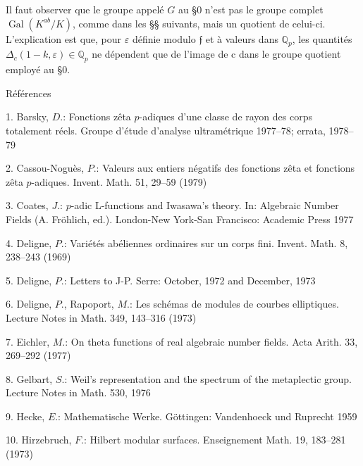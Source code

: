 \documentclass[11pt]{article}
\begin{document}
Il faut observer que le groupe appelé \(G\) au §0 n’est pas le groupe complet \(\operatorname{Gal}(K^{ab}/K)\), comme dans les §§ suivants, mais un quotient de celui-ci. L’explication est que, pour \(\varepsilon \) définie modulo \(𝔣\) et à valeurs dans \(\mathbb{Q}_{p}\), les quantités \(\Delta _{c}(1-k,\varepsilon )\in \mathbb{Q}_{p}\) ne dépendent que de l’image de c dans le groupe quotient employé au §0.\par
\par
Références\par
\par
1. Barsky, \(D\).: Fonctions zêta \(p\)-adiques d’une classe de rayon des corps totalement réels. Groupe d’étude d’analyse ultramétrique 1977--78; errata, 1978--79\par
\par
2. Cassou-Noguès, \(P\).: Valeurs aux entiers négatifs des fonctions zêta et fonctions zêta \(p\)-adiques. Invent. Math. 51, 29--59 (1979)\par
\par
3. Coates, \(J\).: \(p\)-adic L-functions and Iwasawa’s theory. In: Algebraic Number Fields (A. Fröhlich, ed.). London-New York-San Francisco: Academic Press 1977\par
\par
4. Deligne, \(P\).: Variétés abéliennes ordinaires sur un corps fini. Invent. Math. 8, 238--243 (1969)\par
\par
5. Deligne, \(P\).: Letters to J-P. Serre: October, 1972 and December, 1973\par
\par
6. Deligne, \(P\)., Rapoport, \(M\).: Les schémas de modules de courbes elliptiques. Lecture Notes in Math. 349, 143--316 (1973)\par
\par
7. Eichler, \(M\).: On theta functions of real algebraic number fields. Acta Arith. 33, 269--292 (1977)\par
\par
8. Gelbart, \(S\).: Weil’s representation and the spectrum of the metaplectic group. Lecture Notes in Math. 530, 1976\par
\par
9. Hecke, \(E\).: Mathematische Werke. Göttingen: Vandenhoeck und Ruprecht 1959\par
\par
10. Hirzebruch, \(F\).: Hilbert modular surfaces. Enseignement Math. 19, 183--281 (1973)\par
\end{document}
